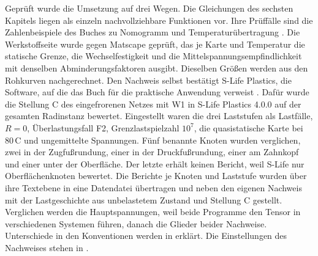 Geprüft wurde die Umsetzung auf drei Wegen. Die Gleichungen des sechsten Kapitels liegen als einzeln nachvollziehbare Funktionen vor. Ihre Prüffälle sind die Zahlenbeispiele des Buches zu Nomogramm und Temperaturübertragung \cite[S.~346 bis 350]{Sto18}. Die Werkstoffseite wurde gegen Matscape geprüft, das je Karte und Temperatur die statische Grenze, die Wechselfestigkeit und die Mittelspannungsempfindlichkeit mit denselben Abminderungsfaktoren ausgibt. Dieselben Größen werden aus den Rohkurven nachgerechnet. Den Nachweis selbst bestätigt S-Life Plastics, die Software, auf die das Buch für die praktische Anwendung verweist \cite[S.~375]{Sto18}. Dafür wurde die Stellung C des eingefrorenen Netzes mit W1 in S-Life Plastics 4.0.0 auf der gesamten Radinstanz bewertet. Eingestellt waren die drei Laststufen als Lastfälle, $R = 0$, Überlastungsfall F2, Grenzlastspielzahl $10^{7}$, die quasistatische Karte bei $80$\,\textdegree C und ungemittelte Spannungen. Fünf benannte Knoten wurden verglichen, zwei in der Zugfußrundung, einer in der Druckfußrundung, einer am Zahnkopf und einer unter der Oberfläche. Der letzte erhält keinen Bericht, weil S-Life nur Oberflächenknoten bewertet. Die Berichte je Knoten und Laststufe wurden über ihre Textebene in eine Datendatei übertragen und neben den eigenen Nachweis mit der Lastgeschichte aus unbelastetem Zustand und Stellung C gestellt. Verglichen werden die Hauptspannungen, weil beide Programme den Tensor in verschiedenen Systemen führen, danach die Glieder beider Nachweise. Unterschiede in den Konventionen werden in  erklärt. Die Einstellungen des Nachweises stehen in .


